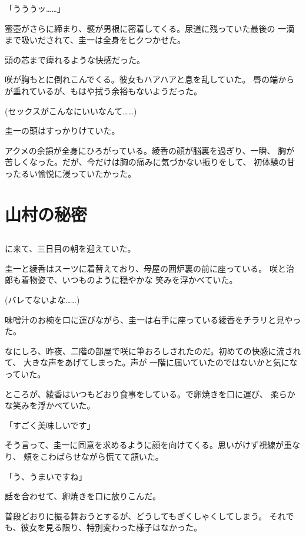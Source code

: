 ﻿\documentclass[
    book,tate,
    line_length=30zw,
    jafontsize=12pt,
    paper=b5j,
    landscape,
    ]{jlreq}
\begin{document}
「うううッ……」

蜜壺がさらに締まり、襞が男根に密着してくる。尿道に残っていた最後の
一滴まで吸いだされて、圭一は全身をヒクつかせた。

頭の芯まで痺れるような快感だった。

咲が胸もとに倒れこんでくる。彼女もハアハアと息を乱していた。
唇の端からが垂れているが、もはや拭う余裕もないようだった。

(セックスがこんなにいいなんて……)

圭一の頭はすっかりけていた。

アクメの余韻が全身にひろがっている。綾香の顔が脳裏を過ぎり、一瞬、
胸が苦しくなった。だが、今だけは胸の痛みに気づかない振りをして、
初体験の甘ったるい愉悦に浸っていたかった。

\chapter{山村の秘密}

\section*{}

に来て、三日目の朝を迎えていた。

圭一と綾香はスーツに着替えており、母屋の囲炉裏の前に座っている。
咲と治郎も着物姿で、いつものように穏やかな 笑みを浮かべていた。

(バレてないよな……)

味噌汁のお椀を口に運びながら、圭一は右手に座っている綾香をチラリと見やった。

なにしろ、昨夜、二階の部屋で咲に筆おろしされたのだ。初めての快感に流されて、
大きな声をあげてしまった。声が 一階に届いていたのではないかと気になっていた。

ところが、綾香はいつもどおり食事をしている。で卵焼きを口に運び、
柔らかな笑みを浮かべていた。

「すごく美味しいです」

そう言って、圭一に同意を求めるように顔を向けてくる。思いがけず視線が重なり、
頰をこわばらせながら慌てて頷いた。

「う、うまいですね」

話を合わせて、卵焼きを口に放りこんだ。

普段どおりに振る舞おうとするが、どうしてもぎくしゃくしてしまう。
それでも、彼女を見る限り、特別変わった様子はなかった。
\end{document}
